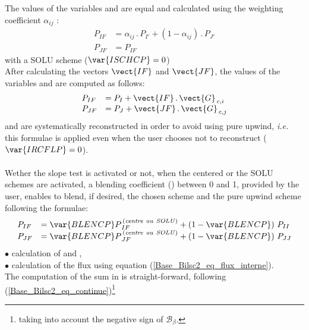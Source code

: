 \hspace*{1.5cm} The values of the variables   and  are equal and calculated 
using the weighting coefficient $\displaystyle\alpha_{ij}$ :
\begin{equation}
\begin{array}{ll}
P_{IF} &=\displaystyle\alpha_{ij}\,.\, P_{I'} + (1 - \displaystyle\alpha_{ij})\,.\, P_{J'}\\
P_{JF} &= P_{IF}
\end{array}
\end{equation}
\hspace*{2.5cm}{\tiny$\bigstar$} with a SOLU scheme ($\var{ISCHCP} = 0$)\\
\hspace*{1.5cm} After calculating the vectors $\vect{IF}$ and $\vect{JF}$, the values of the variables  and  are computed as follows:
\begin{equation}
\begin{array}{ll}
P_{IF} &= P_I + \vect{IF}\,.\,\vect{G}_{\,c,i}\\
P_{JF} &= P_J + \vect{JF}\,.\,\vect{G}_{\,c,j}\\
\end{array}
\end{equation}
\hspace*{1.5cm}  and  are systematically reconstructed in order to avoid
using pure upwind, {\it i.e.} this formulae is applied even when the user 
chooses not to reconstruct ($\var{IRCFLP} = 0$).\\\\

Wether the slope test is activated or not, when the centered or the SOLU schemes are activated,
a blending coefficient () between 0 and 1, provided by the user, enables to blend, if desired, the chosen scheme and the pure upwind scheme following the formulae:
\begin{equation}
\begin{array}{ll}
P_{IF} &= \var{BLENCP} P^{\,\it (centre\  ou\  SOLU) }_{\,IF} + (1 - \var{BLENCP})\  P_{II}\\
P_{JF} &= \var{BLENCP} P^{\,\it (centre\  ou\  SOLU) }_{\,JF} + (1 - \var{BLENCP})\  P_{JJ}\\
\end{array}
\end{equation}
$\bullet$ calculation of  and ,\\
$\bullet$ calculation of the flux  using equation (\ref{Base_Bilsc2_eq_flux_interne}).\\
The computation of the sum in  is straight-forward, following (\ref{Base_Bilsc2_eq_continue})\footnote{ taking into account the negative sign of $\mathcal{B_{\mathcal{\beta}}}$.} 

